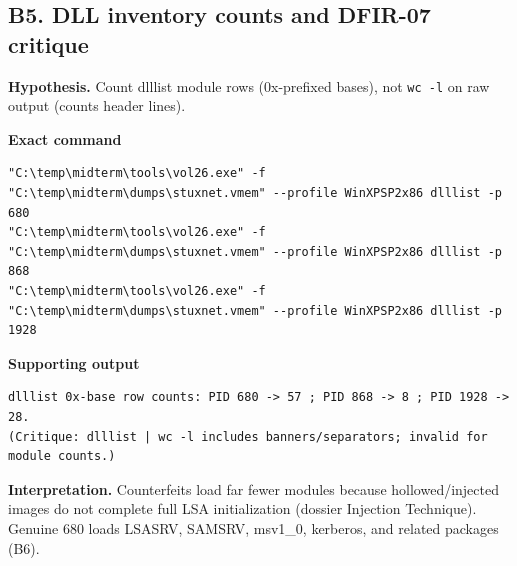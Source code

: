 \documentclass[11pt,letterpaper]{article}
\begin{document}
\subsection*{B5. DLL inventory counts and DFIR-07 critique}
\textbf{Hypothesis.} Count dlllist module rows (0x-prefixed bases), not \texttt{wc -l} on raw output (counts header lines).
\par\medskip\noindent\textbf{Exact command}
\begin{lstlisting}
"C:\temp\midterm\tools\vol26.exe" -f "C:\temp\midterm\dumps\stuxnet.vmem" --profile WinXPSP2x86 dlllist -p 680
"C:\temp\midterm\tools\vol26.exe" -f "C:\temp\midterm\dumps\stuxnet.vmem" --profile WinXPSP2x86 dlllist -p 868
"C:\temp\midterm\tools\vol26.exe" -f "C:\temp\midterm\dumps\stuxnet.vmem" --profile WinXPSP2x86 dlllist -p 1928
\end{lstlisting}
\noindent\textbf{Supporting output}
\begin{lstlisting}
dlllist 0x-base row counts: PID 680 -> 57 ; PID 868 -> 8 ; PID 1928 -> 28.
(Critique: dlllist | wc -l includes banners/separators; invalid for module counts.)
\end{lstlisting}
\noindent\textbf{Interpretation.} Counterfeits load far fewer modules because hollowed/injected images do not complete full LSA initialization (dossier Injection Technique). Genuine 680 loads LSASRV, SAMSRV, msv1\_0, kerberos, and related packages (B6).
\vspace{0.55em}
\end{document}

